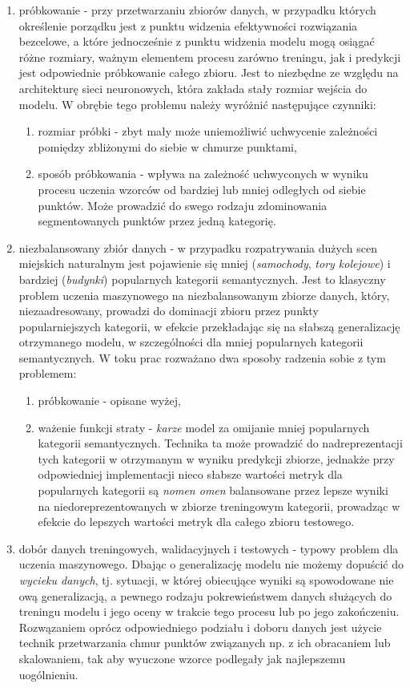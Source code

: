 \begin{enumerate}
    \item próbkowanie - przy przetwarzaniu zbiorów danych, w przypadku których określenie porządku jest z punktu widzenia efektywności rozwiązania bezcelowe, a które jednocześnie z punktu widzenia modelu mogą osiągać różne rozmiary, ważnym elementem procesu zarówno treningu, jak i predykcji jest odpowiednie próbkowanie całego zbioru. Jest to niezbędne ze względu na architekturę sieci neuronowych, która zakłada stały rozmiar wejścia do modelu. W obrębie tego problemu należy wyróżnić następujące czynniki:
    \begin{enumerate}
        \item rozmiar próbki - zbyt mały może uniemożliwić uchwycenie zależności pomiędzy zbliżonymi do siebie w chmurze punktami,
        \item sposób próbkowania - wpływa na zależność uchwyconych w wyniku procesu uczenia wzorców od bardziej lub mniej odległych od siebie punktów. Może prowadzić do swego rodzaju zdominowania segmentowanych punktów przez jedną kategorię.
    \end{enumerate}
    \item niezbalansowany zbiór danych - w przypadku rozpatrywania dużych scen miejskich naturalnym jest pojawienie się mniej (\textit{samochody}, \textit{tory kolejowe}) i bardziej (\textit{budynki}) popularnych kategorii semantycznych. Jest to klasyczny problem uczenia maszynowego na niezbalansowanym zbiorze danych, który, niezaadresowany, prowadzi do dominacji zbioru przez punkty popularniejszych kategorii, w efekcie przekładając się na słabszą generalizację otrzymanego modelu, w szczególności dla mniej popularnych kategorii semantycznych. W toku prac rozważano dwa sposoby radzenia sobie z tym problemem:
    \begin{enumerate}
        \item próbkowanie - opisane wyżej,
        \item ważenie funkcji straty - \textit{karze} model za omijanie mniej popularnych kategorii semantycznych. Technika ta może prowadzić do nadreprezentacji tych kategorii w otrzymanym w wyniku predykcji zbiorze, jednakże przy odpowiedniej implementacji nieco słabsze wartości metryk dla popularnych kategorii są \textit{nomen omen} balansowane przez lepsze wyniki na niedoreprezentowanych w zbiorze treningowym kategorii, prowadząc w efekcie do lepszych wartości metryk dla całego zbioru testowego.
    \end{enumerate}
    \item dobór danych treningowych, walidacyjnych i testowych - typowy problem dla uczenia maszynowego. Dbając o generalizację modelu nie możemy dopuścić do \textit{wycieku danych}, tj. sytuacji, w której obiecujące wyniki są spowodowane nie ową generalizacją, a pewnego rodzaju pokrewieństwem danych służących do treningu modelu i jego oceny w trakcie tego procesu lub po jego zakończeniu. Rozwązaniem oprócz odpowiedniego podziału i doboru danych jest użycie technik przetwarzania chmur punktów związanych np. z ich obracaniem lub skalowaniem, tak aby wyuczone wzorce podlegały jak najlepszemu uogólnieniu.
\end{enumerate}

